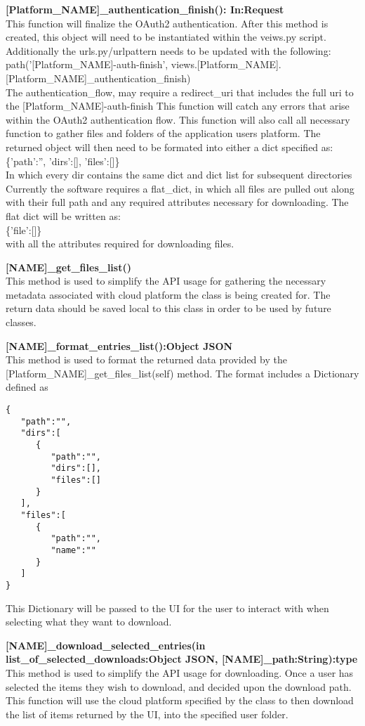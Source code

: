 \textbf{[Platform\_NAME]\_authentication\_finish(): In:Request} \\
This function will finalize the OAuth2 authentication. After this method is created, this object will need to be instantiated
within the veiws.py script. Additionally the urls.py/urlpattern needs to be updated with the following: \\
  path('[Platform\_NAME]-auth-finish', views.[Platform\_NAME].[Platform\_NAME]\_authentication\_finish) \\
The authentication\_flow, may require a redirect\_uri that includes the full uri to the [Platform\_NAME]-auth-finish
This function will catch any errors that arise within the OAuth2 authentication flow. 
This function will also call all necessary function to gather files and folders of the application users platform.
The returned object will then need to be formated into either a dict specified as: \\
  \{'path':'', 'dirs':[], 'files':[]\} \\
   In which every dir contains the same dict and dict list for subsequent directories
Currently the software requires a flat\_dict, in which all files are pulled out along with their full path and any required 
attributes necessary for downloading. The flat dict will be written as: \\
  \{'file':[]\} \\ 
with all the attributes required for downloading files.

\textbf{[NAME]\_get\_files\_list()} \\
This method is used to simplify the API usage for gathering the necessary metadata associated with cloud platform the class is being created for.
The return data should be saved local to this class in order to be used by future classes. 

\textbf{[NAME]\_format\_entries\_list():Object JSON} \\
This method is used to format the returned data provided by the [Platform\_NAME]\_get\_files\_list(self) method. The format includes a Dictionary defined as 
\begin{verbatim}
{
   "path":"",
   "dirs":[
      {
         "path":"",
         "dirs":[],
         "files":[]
      }
   ],
   "files":[
      {
         "path":"",
         "name":""
      }
   ]
}
\end{verbatim}
This Dictionary will be passed to the UI for the user to interact with when selecting what they want to download.

\textbf{[NAME]\_download\_selected\_entries(in list\_of\_selected\_downloads:Object JSON, [NAME]\_path:String):type} \\
This method is used to simplify the API usage for downloading. Once a user has selected the items they wish to download, and decided upon the 
download path. This function will use the cloud platform specified by the class to then download the list of items returned by the UI, into the 
specified user folder.

